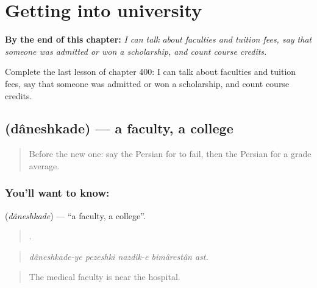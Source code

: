 
\chapter{Getting into university}
\label{ch:fa-getting-into-university}

\begin{chapteropening}
\textbf{By the end of this chapter:} \emph{I can talk about faculties and tuition fees, say that someone was admitted or won a scholarship, and count course credits.}

Complete the last lesson of chapter 400: I can talk about faculties and tuition fees, say that someone was admitted or won a scholarship, and count course credits.
\end{chapteropening}

\section[\texorpdfstring{\fa{دانشکده} (dâneshkade)}{دانشکده (dâneshkade)}]{ (dâneshkade) — a faculty, a college}

\label{lesson:FA-C400-daneshkade}



\begin{quote}
Before the new one: say the Persian for to fail, then the Persian for a grade average.
\end{quote}

\subsection*{You'll want to know: }
\textbf{} (\emph{dâneshkade}) — \textquotedblleft{}a faculty, a college\textquotedblright{}.

\begin{quote}
    .
\end{quote}

\begin{quote}
\emph{dâneshkade-ye pezeshki nazdik-e bimârestân ast.}
\end{quote}

\begin{quote}
The medical faculty is near the hospital.
\end{quote}

